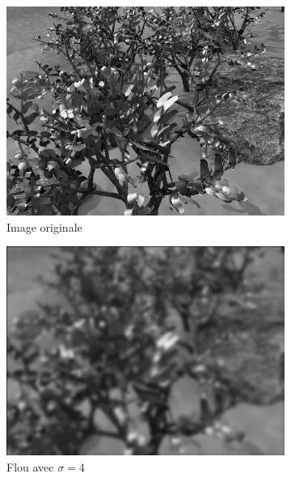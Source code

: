 \begin{enumerate}[questions, start=11]
\begin{figure}[!h]
  \begin{subfigure}{0.3\textwidth}
  \includegraphics[width=\textwidth]{img/grove-noblur.png}
  \caption{Image originale}
  \end{subfigure}\hfill
  \begin{subfigure}{0.3\textwidth}
  \includegraphics[width=\textwidth]{img/grove-blur-4.png}
  \caption{Flou avec $\sigma = 4$}
  \end{subfigure}\hfill
  \begin{subfigure}{0.3\textwidth}

\end{subfigure}
\end{figure}
\end{enumerate}
